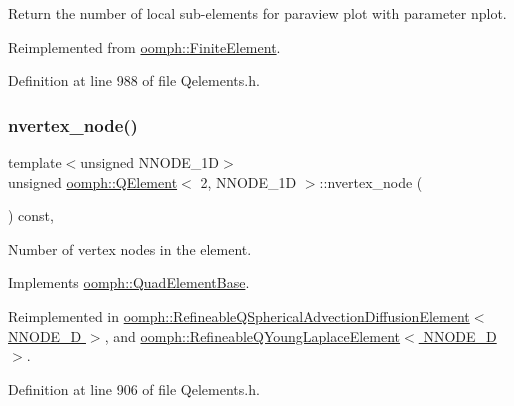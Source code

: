 Return the number of local sub-\/elements for paraview plot with parameter nplot. 



Reimplemented from \hyperlink{classoomph_1_1FiniteElement_aa1e11deffc8ee67adaa59ce3ade0579f}{oomph\+::\+Finite\+Element}.



Definition at line 988 of file Qelements.\+h.

\mbox{\label{classoomph_1_1QElement_3_012_00_01NNODE__1D_01_4_a6f0b16e49ea89943992de42be44a2786}} 
\subsubsection{\texorpdfstring{nvertex\+\_\+node()}{nvertex\_node()}}
{\footnotesize\ttfamily template$<$unsigned N\+N\+O\+D\+E\+\_\+1D$>$ \\
unsigned \hyperlink{classoomph_1_1QElement}{oomph\+::\+Q\+Element}$<$ 2, N\+N\+O\+D\+E\+\_\+1D $>$\+::nvertex\+\_\+node (\begin{DoxyParamCaption}{ }\end{DoxyParamCaption}) const\hspace{0.3cm}{\ttfamily [inline]}, {\ttfamily [virtual]}}



Number of vertex nodes in the element. 



Implements \hyperlink{classoomph_1_1QuadElementBase_a84d28d4fad80333d994d9455596b1ae9}{oomph\+::\+Quad\+Element\+Base}.



Reimplemented in \hyperlink{classoomph_1_1RefineableQSphericalAdvectionDiffusionElement_afcf743949d8dfc8d67cdd980294e7840}{oomph\+::\+Refineable\+Q\+Spherical\+Advection\+Diffusion\+Element$<$ N\+N\+O\+D\+E\+\_\+D $>$}, and \hyperlink{classoomph_1_1RefineableQYoungLaplaceElement_a529edc16e5232c8f1387f8858f8f20ad}{oomph\+::\+Refineable\+Q\+Young\+Laplace\+Element$<$ N\+N\+O\+D\+E\+\_\+D $>$}.



Definition at line 906 of file Qelements.\+h.



